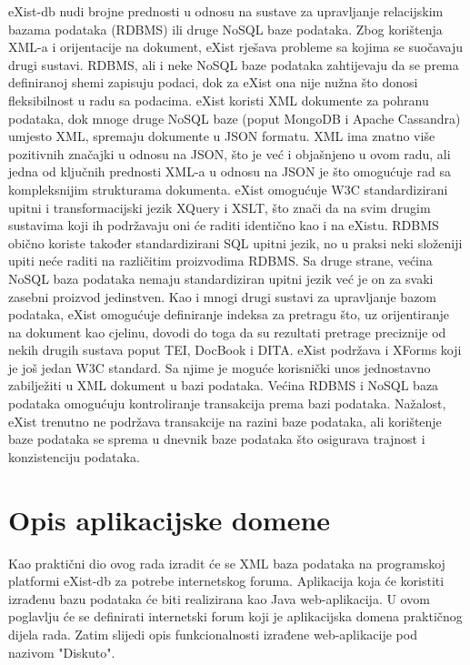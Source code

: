 \documentclass{foi}
\begin{document}
eXist-db nudi brojne prednosti u odnosu na sustave za upravljanje relacijskim bazama podataka (RDBMS) ili druge NoSQL baze podataka. Zbog korištenja XML-a i orijentacije na dokument, eXist rješava probleme sa kojima se suočavaju drugi sustavi. RDBMS, ali i neke NoSQL baze podataka zahtijevaju da se prema definiranoj shemi zapisuju podaci, dok za eXist ona nije nužna što donosi fleksibilnost u radu sa podacima. eXist koristi XML dokumente za pohranu podataka, dok mnoge druge NoSQL baze (poput MongoDB i Apache Cassandra) umjesto XML, spremaju dokumente u JSON formatu. XML ima znatno više pozitivnih značajki u odnosu na JSON, što je već i objašnjeno u ovom radu, ali jedna od ključnih prednosti XML-a u odnosu na JSON je što omogućuje rad sa kompleksnijim strukturama dokumenta. eXist omogućuje W3C standardizirani upitni i transformacijski jezik XQuery i XSLT, što znači da na svim drugim sustavima koji ih podržavaju oni će raditi identično kao i na eXistu. RDBMS obično koriste također standardizirani SQL upitni jezik, no u praksi neki složeniji upiti neće raditi na različitim proizvodima RDBMS. Sa druge strane, većina NoSQL baza podataka nemaju standardiziran upitni jezik već je on za svaki zasebni proizvod jedinstven. Kao i mnogi drugi sustavi za upravljanje bazom podataka, eXist omogućuje definiranje indeksa za pretragu što, uz orijentiranje na dokument kao cjelinu, dovodi do toga da su rezultati pretrage preciznije od nekih drugih sustava poput TEI, DocBook i DITA. eXist podržava i XForms koji je još jedan W3C standard. Sa njime je moguće korisnički unos jednostavno zabilježiti u XML dokument u bazi podataka. Većina RDBMS i NoSQL baza podataka omogućuju kontroliranje transakcija prema bazi podataka. Nažalost, eXist trenutno ne podržava transakcije na razini baze podataka, ali korištenje baze podataka se sprema u dnevnik baze podataka što osigurava trajnost i konzistenciju podataka. \cite{exist}

\chapter{Opis aplikacijske domene}

Kao praktični dio ovog rada izradit će se XML baza podataka na programskoj platformi eXist-db za potrebe internetskog foruma. Aplikacija koja će koristiti izrađenu bazu podataka će biti realizirana kao Java web-aplikacija. U ovom poglavlju će se definirati internetski forum koji je aplikacijska domena praktičnog dijela rada. Zatim slijedi opis funkcionalnosti izrađene web-aplikacije pod nazivom "Diskuto".
\end{document}

